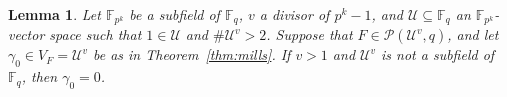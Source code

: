 \documentclass[11pt]{amsart}
\newcommand{\F}{\mathbb{F}}
\newtheorem{lemma}[theorem]{Lemma}
\theoremstyle{definition}
\theoremstyle{remark}
\begin{document}
%
%
%
%
%
%
%



 \begin{lemma}\label{lem:gamma}
Let $\F_{p^k}$ be a subfield of $ \F_q$, $v$ a divisor of $p^k-1$, and $\mathcal U\subseteq \F_q$  an $\F_{p^k}$-vector space such that $1\in \mathcal U$ and $\#\mathcal U^v>2$. Suppose that $F\in \mathcal P(\mathcal U^v, q)$, and let $\gamma_0 \in V_F=\mathcal U^v$ be as in Theorem~\ref{thm:mills}. If $v>1$ and $\mathcal U^v$ is not a subfield of $\F_q$, then $\gamma_0=0$.
\end{lemma}
 
\end{document}
